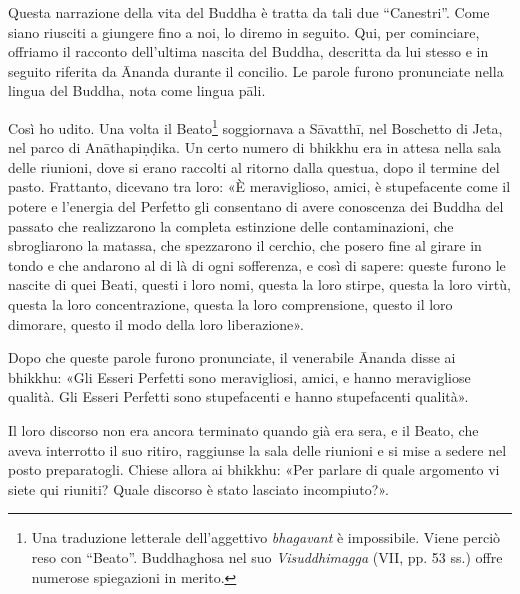  Questa narrazione della vita del Buddha è tratta da
tali due “Canestri”. Come siano riusciti a giungere fino a noi, lo diremo in
seguito. Qui, per cominciare, offriamo il racconto dell’ultima nascita del
Buddha, descritta da lui stesso e in seguito riferita da Ānanda durante il
concilio. Le parole furono pronunciate nella lingua del Buddha, nota come lingua
pāli.

 Così ho udito. Una volta il Beato\footnote{Una traduzione
  letterale dell’aggettivo \emph{bhagavant} è impossibile. Viene perciò reso con
  “Beato”. Buddhaghosa nel suo \emph{Visuddhimagga} (VII, pp. 53 ss.) offre
  numerose spiegazioni in merito.} soggiornava a Sāvatthī, nel Boschetto di
Jeta, nel parco di Anāthapiṇḍika. Un certo numero di bhikkhu
era in attesa nella sala delle riunioni, dove si erano raccolti al ritorno dalla
questua, dopo il termine del pasto. Frattanto, dicevano tra loro: «È
meraviglioso, amici, è stupefacente come il potere e l’energia del Perfetto gli
consentano di avere conoscenza dei Buddha del passato che realizzarono la
completa estinzione delle contaminazioni, che sbrogliarono la matassa, che
spezzarono il cerchio, che posero fine al girare in tondo e che andarono al di
là di ogni sofferenza, e così di sapere: queste furono le nascite di quei Beati,
questi i loro nomi, questa la loro stirpe, questa la loro virtù, questa la loro
concentrazione, questa la loro comprensione, questo il loro dimorare, questo il
modo della loro liberazione».

Dopo che queste parole furono pronunciate, il venerabile Ānanda disse ai
bhikkhu: «Gli Esseri Perfetti sono meravigliosi, amici, e hanno meravigliose
qualità. Gli Esseri Perfetti sono stupefacenti e hanno stupefacenti qualità».

Il loro discorso non era ancora terminato quando già era sera, e il Beato, che
aveva interrotto il suo ritiro, raggiunse la sala delle riunioni e si mise a
sedere nel posto preparatogli. Chiese allora ai bhikkhu: «Per parlare di quale
argomento vi siete qui riuniti? Quale discorso è stato lasciato incompiuto?».

